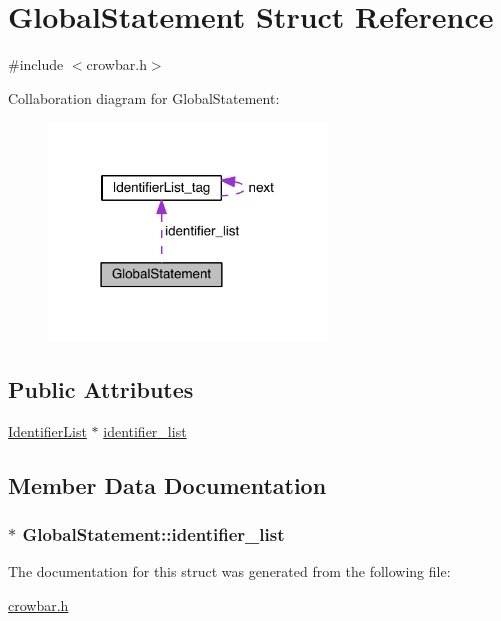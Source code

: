 \hypertarget{struct_global_statement}{}\section{Global\+Statement Struct Reference}
\label{struct_global_statement}


{\ttfamily \#include $<$crowbar.\+h$>$}



Collaboration diagram for Global\+Statement\+:\nopagebreak
\begin{figure}[H]
\begin{center}
\leavevmode
\includegraphics[width=210pt]{struct_global_statement__coll__graph}
\end{center}
\end{figure}
\subsection*{Public Attributes}
\begin{DoxyCompactItemize}
\item 
\hyperlink{crowbar_8h_a3e8fd423ff4b73a7c5d557375f0a8741}{Identifier\+List} $\ast$ \hyperlink{struct_global_statement_a5d68fa84111ef8d6ed16dc7f3dbdd2ab}{identifier\+\_\+list}
\end{DoxyCompactItemize}


\subsection{Member Data Documentation}
\hypertarget{struct_global_statement_a5d68fa84111ef8d6ed16dc7f3dbdd2ab}{}
\subsubsection[{identifier\+\_\+list}]{$\ast$ Global\+Statement\+::identifier\+\_\+list}\label{struct_global_statement_a5d68fa84111ef8d6ed16dc7f3dbdd2ab}


The documentation for this struct was generated from the following file\+:\begin{DoxyCompactItemize}
\item 
\hyperlink{crowbar_8h}{crowbar.\+h}\end{DoxyCompactItemize}
